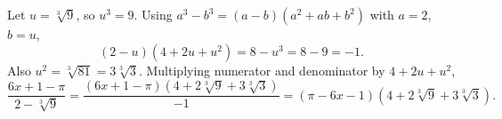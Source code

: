 Let $u=\sqrt[3]{9}$, so $u^3=9$. Using $a^3-b^3=(a-b)(a^2+ab+b^2)$ with $a=2$, $b=u$,
\[
(2-u)(4+2u+u^2)=8-u^3=8-9=-1.
\]
Also $u^2=\sqrt[3]{81}=3\sqrt[3]{3}$. Multiplying numerator and denominator by $4+2u+u^2$,
\[
\dfrac{6x+1-\pi}{2-\sqrt[3]9}=\dfrac{(6x+1-\pi)(4+2\sqrt[3]9+3\sqrt[3]3)}{-1}=\boxed{(\pi-6x-1)\left(4+2\sqrt[3]{9}+3\sqrt[3]{3}\right)}.
\]
